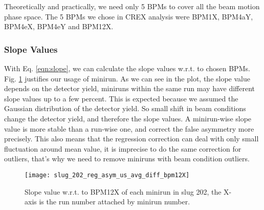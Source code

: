\begin{comment}
For multiple detectors, it is easy to get:
\begin{equation}
    \small
    \begin{aligned}
	\begin{pmatrix}
	    \beta_{11}	& \beta_{21}    & \cdots & \beta_{m1}	\\
	    \beta_{12}	& \beta_{22}    & \cdots & \beta_{m2}	\\
	    \vdots	& \vdots    & \ddots	& \vdots\\
	    \beta_{1n}	& \beta_{2n}    & \cdots & \beta_{mn}	\\
	\end{pmatrix}
	&= A^{-1}
	&\times
	\begin{pmatrix}
	    cov(\Delta D^1, \Delta M^1) & cov(\Delta D^2, \Delta M^1)   & \cdots	& cov(\Delta D^m, \Delta M^1)	\\
	    cov(\Delta D^1, \Delta M^2) & cov(\Delta D^2, \Delta M^2)   & \cdots	& cov(\Delta D^m, \Delta M^2)	\\
	    \vdots	& \vdots    & \ddots	& \vdots    \\
	    cov(\Delta D^1, \Delta M^n) & cov(\Delta D^2, \Delta M^n)   & \cdots	& cov(\Delta D^m, \Delta M^n)	\\
	\end{pmatrix}
    \end{aligned}
    \label{eqn:slope}
\end{equation}
where $\beta_{ij}$ refers to detector i's response to change in monitor j.
\end{comment}

Theoretically and practically, we need only 5 BPMs to cover all the beam motion phase space.
The 5 BPMs we chose in CREX analysis were BPM1X, BPM4aY, BPM4eX, BPM4eY and BPM12X.

\subsubsection{Slope Values}
With Eq. \ref{eqn:slope}, we can calculate the slope values w.r.t. to chosen 
BPMs. Fig. \ref{fig:slug_202_reg_asym_us_avg_diff_bpm12X} justifies our usage
of minirun. As we can see in the plot, the slope value depends on the detector 
yield, miniruns within the same run may have different slope values up to a few 
percent. This is expected because we assumed the Gaussian distribution
of the detector yield. So small shift in beam conditions change the detector
yield, and therefore the slope values. A minirun-wise slope value is more stable
than a run-wise one, and correct the false asymmetry more precisely. This also
means that the regression correction can deal with only small fluctuation around 
mean value, it is imprecise to do the same correction for outliers, that's why
we need to remove miniruns with beam condition outliers.
\begin{figure}[H]
    \centering
    \texttt{[image: slug\_202\_reg\_asym\_us\_avg\_diff\_bpm12X]}
    \caption{Slope value w.r.t. to BPM12X of each minirun in slug 202, the X-axis 
    is the run number attached by minirun number.}
    \label{fig:slug_202_reg_asym_us_avg_diff_bpm12X}
\end{figure}

